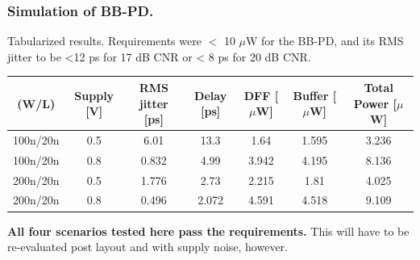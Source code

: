 \documentclass[t, screen, aspectratio=43]{beamer}
\begin{document}
\begin{frame}
	\frametitle{Simulation of BB-PD.}
	\begin{block}{Tabularized results.}
		\tiny
		Requirements were $<$ 10 $\mu$W for the BB-PD, and its RMS jitter to be <12 ps for 17 dB CNR or < 8 ps for 20 dB CNR.
		\begin{table}[h!]
			\centering
			\def\arraystretch{1.5}		
			\setlength\arrayrulewidth{0.75pt}
			\setlength{\tabcolsep}{1em} %
			\begin{tabular}{|c|c|c|c|c|c|c|}
				\hline 
				\rule[-1ex]{0pt}{2.5ex} \cellcolor{gray!40}\textbf{(W/L)} & \cellcolor{gray!40}\textbf{Supply [V]} & \cellcolor{gray!40}\textbf{RMS jitter [ps]}& \cellcolor{gray!40}\textbf{Delay [ps]} & \cellcolor{gray!40}\textbf{DFF [$\mu$W]} & \cellcolor{gray!40}\textbf{Buffer [$\mu$W]} & \cellcolor{gray!40}\textbf{Total Power [$\mu$W]}\\ 
				\hline 
				\rule[-1ex]{0pt}{2.5ex} 100n/20n  & 0.5 & 6.01 & 13.3 & 1.64 & 1.595 & 3.236 \\ 
				\hline 
				\rule[-1ex]{0pt}{2.5ex} 100n/20n  & 0.8 & 0.832 & 4.99 & 3.942 & 4.195 & 8.136 \\ 
				\hline 
				\rule[-1ex]{0pt}{2.5ex} 200n/20n  & 0.5 & 1.776 & 2.73 & 2.215 & 1.81 & 4.025 \\ 
				\hline 
				\rule[-1ex]{0pt}{2.5ex} 200n/20n  & 0.8 & 0.496 & 2.072 & 4.591 & 4.518 & 9.109 \\ 
				\hline 
			\end{tabular} 
		\end{table}   
		{\color{red}\textbf{All four scenarios tested here pass the requirements.}} This will have to be re-evaluated post layout and with supply noise, however.
	\end{block}    
\end{frame}
\end{document}
